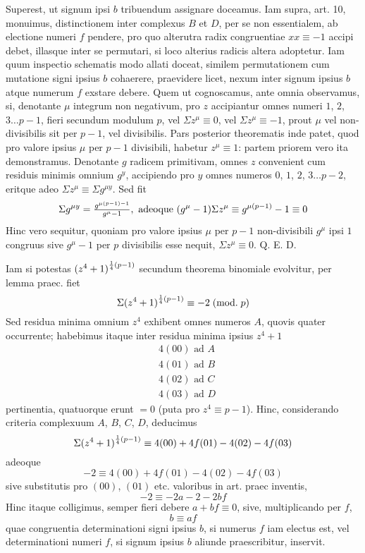 \documentclass[twoside,12pt, showframe]{memoir}
\renewcommand{\pmod}[1]{\;(\textrm{mod.}\;#1)}
\let\oldfrac\frac
\def\frac#1#2{\mathchoice{\tfrac{#1}{#2}}{\oldfrac{#1}{#2}}{\genfrac{}{}{}{2}{#1}{#2\mathstrut}}{\genfrac{}{}{}{3}{#1}{#2\mathstrut}}}
\begin{document}
Superest, ut signum ipsi \(b\) tribuendum assignare doceamus. Iam supra, art. 10, monuimus, distinctionem inter complexus \(B\) et \(D\), per se non essentialem, ab electione numeri \(f\) pendere, pro quo alterutra radix congruentiae \(x x \equiv-1\) accipi debet, illasque inter se permutari, si loco alterius radicis altera adoptetur. Iam quum inspectio schematis modo allati doceat, similem permutationem cum mutatione signi ipsius \(b\) cohaerere, praevidere licet, nexum inter signum ipsius \(b\) atque numerum \(f\) exstare debere. Quem ut cognoscamus, ante omnia observamus, si, denotante \(\mu\) integrum non negativum, pro \(z\) accipiantur omnes numeri \(1\), \(2\), \(3 \ldots p-1\), fieri secundum modulum \(p\), vel \(\Sigma z^{\mu} \equiv 0\), vel \(\Sigma z^{\mu} \equiv-1\), prout \(\mu\) vel non-divisibilis sit per \(p-1\), vel divisibilis. Pars posterior theorematis inde patet, quod pro valore ipsius \(\mu\) per \(p-1\) divisibili, habetur \(z^{\mu} \equiv 1\): partem priorem vero ita demonstramus. Denotante \(g\) radicem primitivam, omnes \(z\) convenient cum residuis minimis omnium \(g^{y}\), accipiendo pro \(y\) omnes numeros \(0\), \(1\), \(2\), \(3 \ldots p-2\), eritque adeo \(\Sigma z^{\mu} \equiv \Sigma g^{\mu y}\). Sed fit
\[\Sigma g^{\mu y}=\frac{g^{\mu(p-1)-1}}{g^{\mu}-1}, \text{ adeoque }(g^{\mu}-1) \Sigma z^{\mu} \equiv g^{\mu(p-1)}-1 \equiv 0\]
Hinc vero sequitur, quoniam pro valore ipsius \(\mu\) per \(p-1\) non-divisibili \(g^{\mu}\) ipsi \(1\) congruus sive \(g^{\mu}-1\) per \(p\) divisibilis esse nequit, \(\Sigma z^{\mu} \equiv 0\). Q. E. D.\clearpage\noindent%

Iam si potestas \((z^{4}+1)^{\frac{1}{4}(p-1)}\) secundum theorema binomiale evolvitur, per lemma praec. fiet
\[\Sigma(z^{4}+1)^{\frac{1}{4}(p-1)} \equiv-2\pmod{p}\]
Sed residua minima omnium \(z^{4}\) exhibent omnes numeros \(A\), quovis quater occurrente; habebimus itaque inter residua minima ipsius \(z^{4}+1\)
\[\begin{aligned}
& 4(00) \text{ ad } A \\
& 4(01) \text{ ad } B \\
& 4(02) \text{ ad } C \\
& 4(03) \text{ ad } D
\end{aligned}\]
pertinentia, quatuorque erunt \(=0\) (puta pro \(z^{4} \equiv p-1\)). Hinc, considerando criteria complexuum \(A\), \(B\), \(C\), \(D\), deducimus
\[\Sigma(z^{4}+1)^{\frac{1}{4}(p-1)} \equiv 4(00)+4 f (01)-4 (02)-4 f (03)\]
adeoque
\[-2 \equiv 4(00)+4 f(01)-4(02)-4 f(03)\]
sive substitutis pro \((00)\), \((01)\) etc. valoribus in art. praec inventis,
\[-2 \equiv-2 a-2-2 b f\]
Hinc itaque colligimus, semper fieri debere \(a+b f \equiv 0\), sive, multiplicando per \(f\),
\[b \equiv a f\]
quae congruentia determinationi signi ipsius \(b\), si numerus \(f\) iam electus est, vel determinationi numeri \(f\), si signum ipsius \(b\) aliunde praescribitur, inservit.
\end{document}
